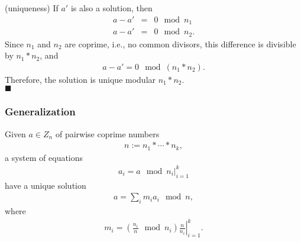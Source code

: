 \documentclass[11pt]{book}
\begin{document}
(uniqueness)
If $a'$ is also a solution, then
\begin{eqnarray}
a - a' &=& 0 \mod n_1 \\
a - a' &=& 0 \mod n_2.
\end{eqnarray}
Since $n_1$ and $n_2$ are coprime, i.e., no common divisors, this difference is divisible by $n_1*n_2$, and
\begin{eqnarray}
a - a' = 0 \mod (n_1 * n_2).
\end{eqnarray}
Therefore, the solution is unique modular $n_1*n_2$. \\
$\blacksquare$

\subsubsection{Generalization}
Given $a \in Z_n$ of pairwise coprime numbers
\begin{eqnarray}
n := n_1 * \cdots * n_k,
\end{eqnarray}
a system of equations
\begin{eqnarray}
\left. a_i = a \mod n_i \right|_{i=1}^k
\end{eqnarray}
have a unique solution
\begin{eqnarray}
a = \sum_i m_i a_i \mod n,
\end{eqnarray}
where
\begin{eqnarray}
\left. m_i = \left( \frac{n_i}{n} \mod n_i \right) \frac{n}{n_i} \right|_{i=1}^k.
\end{eqnarray}
\end{document}
